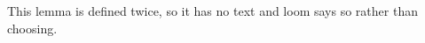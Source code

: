 \begin{lemma}\label{sy-999E}
This lemma is defined twice, so it has no text and loom says so rather than choosing.
\end{lemma}
